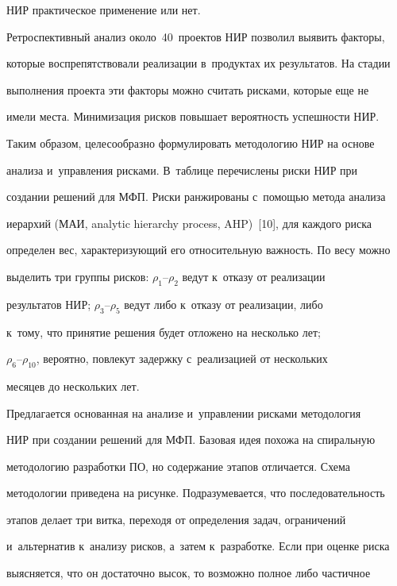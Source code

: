 НИР практическое применение или нет. 


  


  Ретроспективный анализ около~40~проектов НИР поз\-во\-лил выявить факторы, 


которые воспрепятствовали реализации в~продуктах их результатов. На стадии 


выполнения проекта эти факторы мож\-но считать рисками, которые еще не 


имели мес\-та. Минимизация рис\-ков повышает ве\-ро\-ят\-ность успеш\-ности НИР. 


Таким образом, целесообразно формулировать методологию НИР на основе 


анализа и~управ\-ле\-ния рисками. В~таб\-ли\-це  пе\-ре\-чис\-ле\-ны риски НИР при 


создании решений для МФП. Рис\-ки ранжированы с~по\-мощью метода анализа 


иерархий (МАИ, analytic hierarchy process, AHP)~[10], для каж\-до\-го рис\-ка 


определен вес, ха\-рак\-те\-ри\-зу\-ющий его относительную важ\-ность. По весу можно 


выделить три группы рисков: $\rho_1$--$\rho_2$ ведут к~отказу от реализации 


результатов НИР; $\rho_3$--$\rho_5$ ведут либо к~отказу от реализации, либо 


к~тому, что принятие решения будет отложено на несколько лет;  


$\rho_6$--$\rho_{10}$, вероятно, по\-вле\-кут задержку с~реализацией от нескольких 


месяцев до нескольких лет.


  


  Предлагается основанная на анализе и~управ\-ле\-нии рис\-ка\-ми методология 


НИР при создании решений для МФП. Базовая идея похожа на спиральную 


методологию разработки ПО, но содержание этапов отличается. Схема 


методологии приведена на рисунке. Подразумевается, что по\-сле\-до\-ва\-тель\-ность 


этапов делает три витка, переходя от определения задач, ограничений 


и~альтернатив к~анализу рис\-ков, а~затем к~разработке. Если при оценке рис\-ка 


выясняется, что он достаточно высок, то воз\-мож\-но полное либо час\-тич\-ное 


